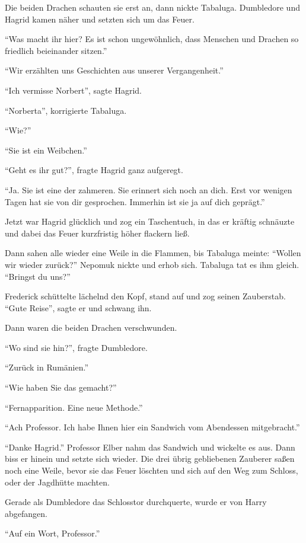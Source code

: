Die beiden Drachen schauten sie erst an, dann nickte Tabaluga. Dumbledore und Hagrid kamen näher und setzten sich um das Feuer.

\enquote{Was macht ihr hier? Es ist schon ungewöhnlich, dass Menschen und Drachen so friedlich beieinander sitzen.}

\enquote{Wir erzählten uns Geschichten aus unserer Vergangenheit.}

\enquote{Ich vermisse Norbert}, sagte Hagrid.

\enquote{Norberta}, korrigierte Tabaluga.

\enquote{Wie?}

\enquote{Sie ist ein Weibchen.}

\enquote{Geht es ihr gut?}, fragte Hagrid ganz aufgeregt.

\enquote{Ja. Sie ist eine der zahmeren. Sie erinnert sich noch an dich. Erst vor wenigen Tagen hat sie von dir gesprochen. Immerhin ist sie ja auf dich geprägt.}

Jetzt war Hagrid glücklich und zog ein Taschentuch, in das er kräftig schnäuzte und dabei das Feuer kurzfristig höher flackern ließ.

Dann sahen alle wieder eine Weile in die Flammen, bis Tabaluga meinte: \enquote{Wollen wir wieder zurück?} Nepomuk nickte und erhob sich. Tabaluga tat es ihm gleich. \enquote{Bringst du uns?}

Frederick schüttelte lächelnd den Kopf, stand auf und zog seinen Zauberstab. \enquote{Gute Reise}, sagte er und schwang ihn.

Dann waren die beiden Drachen verschwunden.

\enquote{Wo sind sie hin?}, fragte Dumbledore.

\enquote{Zurück in Rumänien.}

\enquote{Wie haben Sie das gemacht?}

\enquote{Fernapparition. Eine neue Methode.}

\enquote{Ach Professor. Ich habe Ihnen hier ein Sandwich vom Abendessen mitgebracht.}

\enquote{Danke Hagrid.} Professor Elber nahm das Sandwich und wickelte es aus. Dann biss er hinein und setzte sich wieder. Die drei übrig gebliebenen Zauberer saßen noch eine Weile, bevor sie das Feuer löschten und sich auf den Weg zum Schloss, oder der Jagdhütte machten.

Gerade als Dumbledore das Schlosstor durchquerte, wurde er von Harry abgefangen.

\enquote{Auf ein Wort, Professor.}

